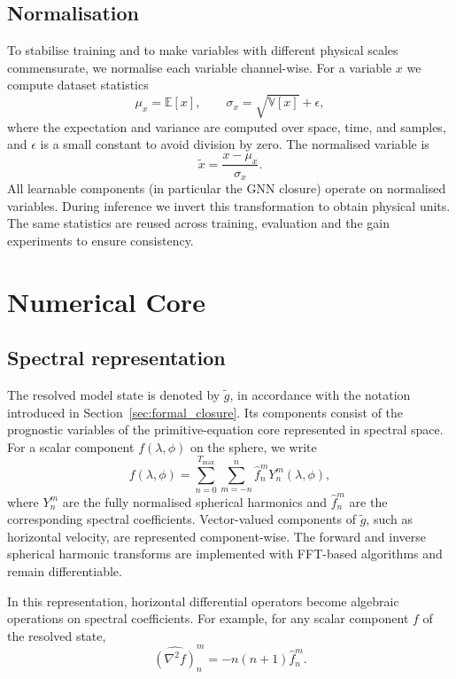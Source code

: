 \subsection{Normalisation}
To stabilise training and to make variables with different physical scales commensurate, we normalise each variable channel-wise. For a variable $x$ we compute dataset statistics
\begin{equation}
  \mu_x = \mathbb{E}[x], \qquad \sigma_x = \sqrt{\mathbb{V}[x]} + \epsilon,
\end{equation}
where the expectation and variance are computed over space, time, and samples, and $\epsilon$ is a small constant to avoid division by zero.
The normalised variable is
\begin{equation}
  \tilde{x} = \frac{x - \mu_x}{\sigma_x}.
\end{equation}
All learnable components (in particular the GNN closure) operate on normalised variables. During inference we invert this transformation to obtain physical units. The same statistics are reused across training, evaluation and the gain experiments to ensure consistency.

\section{Numerical Core}
\label{sec:numerical-core}

\subsection{Spectral representation}
The resolved model state is denoted by $\widetilde{g}$, in accordance with the notation introduced in Section~\ref{sec:formal_closure}. Its components consist of the prognostic variables of the primitive-equation core represented in spectral space. For a scalar component $f(\lambda,\phi)$ on the sphere, we write
\begin{equation}
  f(\lambda, \phi)
  = \sum_{n=0}^{T_{\max}} \sum_{m=-n}^{n} \hat{f}_{n}^{m} Y_{n}^{m}(\lambda, \phi),
\end{equation}
where $Y_n^m$ are the fully normalised spherical harmonics and $\hat{f}_n^m$ are the corresponding spectral coefficients. Vector-valued components of $\widetilde{g}$, such as horizontal velocity, are represented component-wise. The forward and inverse spherical harmonic transforms are implemented with FFT-based algorithms and remain differentiable.

In this representation, horizontal differential operators become algebraic operations on spectral coefficients. For example, for any scalar component $f$ of the resolved state,
\begin{equation}
  \widehat{(\nabla^2 f)}_n^m = -n(n+1)\hat{f}_n^m.
\end{equation}

